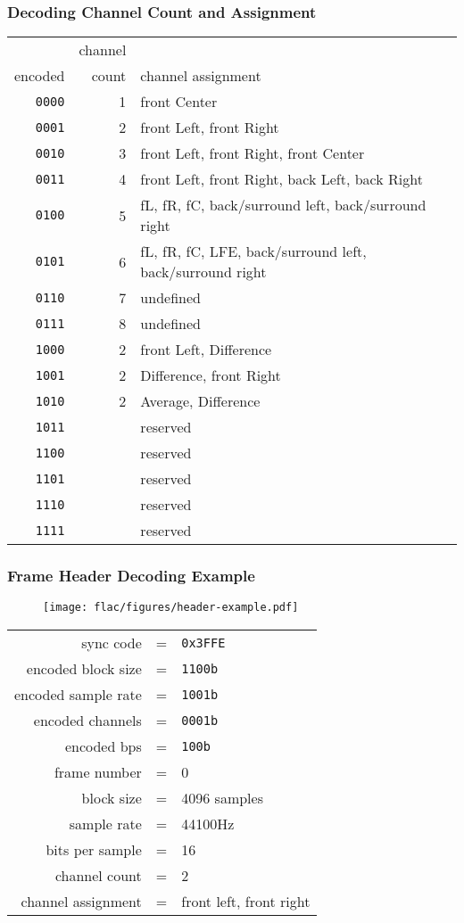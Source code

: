 \subsubsection{Decoding Channel Count and Assignment}
{
\begin{tabular}{rrl}
& channel & \\
encoded & count & channel assignment \\
\hline
\texttt{0000} & 1 & front Center \\
\texttt{0001} & 2 & front Left, front Right \\
\texttt{0010} & 3 & front Left, front Right, front Center \\
\texttt{0011} & 4 & front Left, front Right, back Left, back Right \\
\texttt{0100} & 5 & fL, fR, fC, back/surround left, back/surround right \\
\texttt{0101} & 6 & fL, fR, fC, LFE, back/surround left, back/surround right \\
\texttt{0110} & 7 & undefined \\
\texttt{0111} & 8 & undefined \\
\texttt{1000} & 2 & front Left, Difference \\
\texttt{1001} & 2 & Difference, front Right \\
\texttt{1010} & 2 & Average, Difference \\
\texttt{1011} & & reserved \\
\texttt{1100} & & reserved \\
\texttt{1101} & & reserved \\
\texttt{1110} & & reserved \\
\texttt{1111} & & reserved \\
\end{tabular}
}

\subsubsection{Frame Header Decoding Example}
\begin{figure}[h]
\texttt{[image: flac/figures/header-example.pdf]}
\end{figure}
{
\begin{tabular}{rcl}
\textsf{sync code} & = & \texttt{0x3FFE} \\
\textsf{encoded block size} & = & \texttt{1100b} \\
\textsf{encoded sample rate} & = & \texttt{1001b} \\
\textsf{encoded channels} & = & \texttt{0001b} \\
\textsf{encoded bps} & = & \texttt{100b} \\
\textsf{frame number} & = & 0 \\
\textsf{block size} & = & 4096 samples \\
\textsf{sample rate} & = & 44100Hz \\
\textsf{bits per sample} & = & 16 \\
\textsf{channel count} & = & 2 \\
\textsf{channel assignment} & = & front left, front right
\end{tabular}
}
